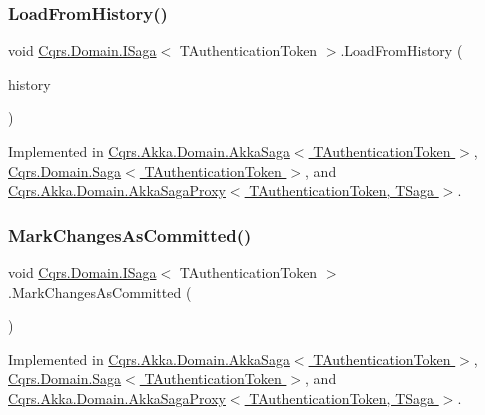 \subsubsection{\texorpdfstring{Load\+From\+History()}{LoadFromHistory()}}
{\footnotesize\ttfamily void \hyperlink{interfaceCqrs_1_1Domain_1_1ISaga}{Cqrs.\+Domain.\+I\+Saga}$<$ T\+Authentication\+Token $>$.Load\+From\+History (\begin{DoxyParamCaption}\item[{I\+Enumerable$<$ \hyperlink{interfaceCqrs_1_1Events_1_1ISagaEvent}{I\+Saga\+Event}$<$ T\+Authentication\+Token $>$$>$}]{history }\end{DoxyParamCaption})}



Implemented in \hyperlink{classCqrs_1_1Akka_1_1Domain_1_1AkkaSaga_a40b859bc15c2f7c87a21b07f9bc9548c_a40b859bc15c2f7c87a21b07f9bc9548c}{Cqrs.\+Akka.\+Domain.\+Akka\+Saga$<$ T\+Authentication\+Token $>$}, \hyperlink{classCqrs_1_1Domain_1_1Saga_a6029fc09445e2093f7fb40e304a04ff8_a6029fc09445e2093f7fb40e304a04ff8}{Cqrs.\+Domain.\+Saga$<$ T\+Authentication\+Token $>$}, and \hyperlink{classCqrs_1_1Akka_1_1Domain_1_1AkkaSagaProxy_a21b69799b046c1fcdf5b2443699dee0c_a21b69799b046c1fcdf5b2443699dee0c}{Cqrs.\+Akka.\+Domain.\+Akka\+Saga\+Proxy$<$ T\+Authentication\+Token, T\+Saga $>$}.

\mbox{\label{interfaceCqrs_1_1Domain_1_1ISaga_a85c75f80bc5be4bad7f1d9f1231bfba7_a85c75f80bc5be4bad7f1d9f1231bfba7}} 
\subsubsection{\texorpdfstring{Mark\+Changes\+As\+Committed()}{MarkChangesAsCommitted()}}
{\footnotesize\ttfamily void \hyperlink{interfaceCqrs_1_1Domain_1_1ISaga}{Cqrs.\+Domain.\+I\+Saga}$<$ T\+Authentication\+Token $>$.Mark\+Changes\+As\+Committed (\begin{DoxyParamCaption}{ }\end{DoxyParamCaption})}



Implemented in \hyperlink{classCqrs_1_1Akka_1_1Domain_1_1AkkaSaga_a83269fac4653cca097461e924feaea7f_a83269fac4653cca097461e924feaea7f}{Cqrs.\+Akka.\+Domain.\+Akka\+Saga$<$ T\+Authentication\+Token $>$}, \hyperlink{classCqrs_1_1Domain_1_1Saga_a9caac842ea6e88d6e502b63ca1820fe4_a9caac842ea6e88d6e502b63ca1820fe4}{Cqrs.\+Domain.\+Saga$<$ T\+Authentication\+Token $>$}, and \hyperlink{classCqrs_1_1Akka_1_1Domain_1_1AkkaSagaProxy_a5a5c012bc0f7f957b8bd2298956ca9ae_a5a5c012bc0f7f957b8bd2298956ca9ae}{Cqrs.\+Akka.\+Domain.\+Akka\+Saga\+Proxy$<$ T\+Authentication\+Token, T\+Saga $>$}.



